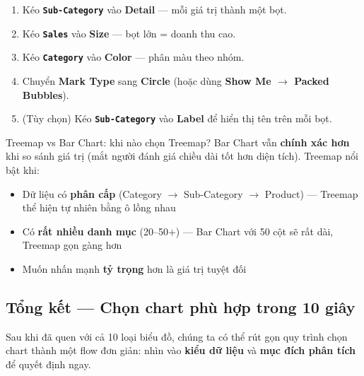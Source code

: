 \documentclass[12pt]{article}
\begin{document}
\begin{enumerate}[nosep]
    \item Kéo \textbf{\texttt{Sub-Category}} vào \textbf{Detail} --- mỗi giá trị thành một bọt.
    \item Kéo \textbf{\texttt{Sales}} vào \textbf{Size} --- bọt lớn = doanh thu cao.
    \item Kéo \textbf{\texttt{Category}} vào \textbf{Color} --- phân màu theo nhóm.
    \item Chuyển \textbf{Mark Type} sang \textbf{Circle} (hoặc dùng \textbf{Show Me $\rightarrow$ Packed Bubbles}).
    \item (Tùy chọn) Kéo \textbf{\texttt{Sub-Category}} vào \textbf{Label} để hiển thị tên trên mỗi bọt.
\end{enumerate}

\begin{guidelinebox}{Treemap vs Bar Chart: khi nào chọn Treemap?}
Bar Chart vẫn \textbf{chính xác hơn} khi so sánh giá trị (mắt người đánh giá chiều dài tốt hơn diện tích). Treemap nổi bật khi:
\begin{itemize}[nosep]
    \item Dữ liệu có \textbf{phân cấp} (Category $\rightarrow$ Sub-Category $\rightarrow$ Product) --- Treemap thể hiện tự nhiên bằng ô lồng nhau
    \item Có \textbf{rất nhiều danh mục} (20--50+) --- Bar Chart với 50 cột sẽ rất dài, Treemap gọn gàng hơn
    \item Muốn nhấn mạnh \textbf{tỷ trọng} hơn là giá trị tuyệt đối
\end{itemize}
\end{guidelinebox}

\subsection{Tổng kết --- Chọn chart phù hợp trong 10 giây}

\noindent Sau khi đã quen với cả 10 loại biểu đồ, chúng ta có thể rút gọn quy trình chọn chart thành một flow đơn giản: nhìn vào \textbf{kiểu dữ liệu} và \textbf{mục đích phân tích} để quyết định ngay.
\end{document}
